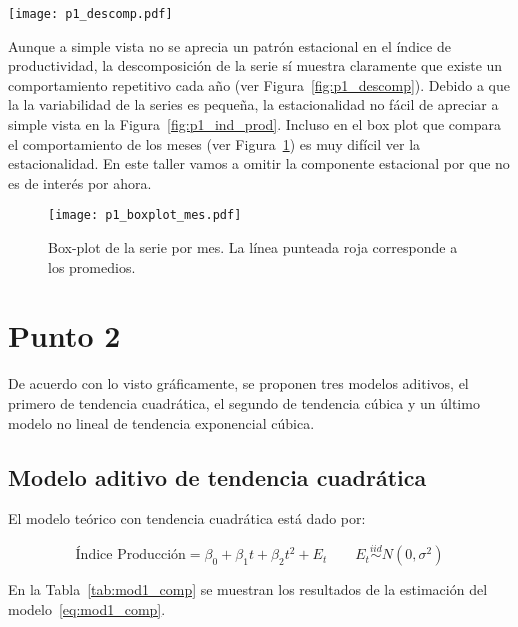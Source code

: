 \documentclass{tufte-handout}
\begin{document}
\begin{figure*}[!ht]
    \texttt{[image: p1\_descomp.pdf]}
    \caption{Descomposición de la serie de tiempo en sus componentes; tendencia ($T_t$), estacional ($S_t$) y error ($E_t$)}
    \label{fig:p1_descomp}
\end{figure*}

Aunque a simple vista no se aprecia un patrón estacional en el índice de productividad, la descomposición de la serie sí muestra claramente que existe un comportamiento repetitivo cada año (ver Figura~\ref{fig:p1_descomp}). Debido a que la la variabilidad de la series es pequeña, la estacionalidad no fácil de apreciar a simple vista en la Figura~\ref{fig:p1_ind_prod}. Incluso en el box plot que compara el comportamiento de los meses (ver Figura~\ref{fig:p1_boxplot_mes}) es muy difícil ver la estacionalidad. En este taller vamos a omitir la componente estacional por que no es de interés por ahora.

\begin{figure}[!ht]
    \texttt{[image: p1\_boxplot\_mes.pdf]}
    \caption{Box-plot de la serie por mes. La línea punteada roja corresponde a los promedios.}
    \label{fig:p1_boxplot_mes}
\end{figure}


\pagebreak


\section*{Punto 2}

De acuerdo con lo visto gráficamente, se proponen tres modelos aditivos, el primero de tendencia cuadrática, el segundo de tendencia cúbica y un último modelo no lineal de tendencia exponencial cúbica.

\subsection*{Modelo aditivo de tendencia cuadrática}

El modelo teórico con tendencia cuadrática está dado por:

\begin{equation} \label{eq:mod1_comp}
	\text{Índice Producción} = \beta_0 + \beta_1 t + \beta_2 t^2 + E_t
	\qquad E_t \stackrel{iid}{\sim} N(0, \sigma^2)
\end{equation}

En la Tabla~\ref{tab:mod1_comp} se muestran los resultados de la estimación del modelo~\ref{eq:mod1_comp}. 
\end{document}
